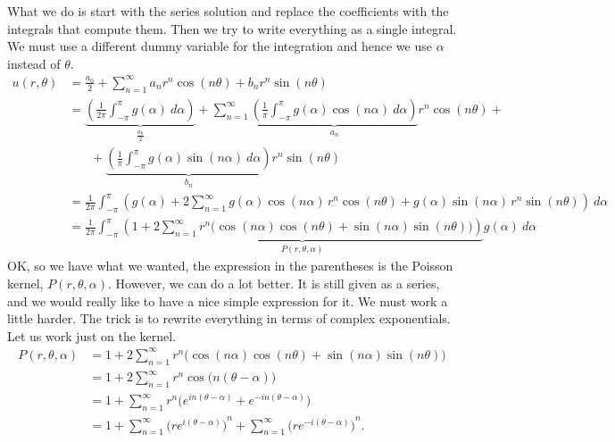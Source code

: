 What we do is start with the series solution and replace the coefficients
with the integrals that compute them.  Then we try to write everything as
a single integral.  We must use a different dummy variable for the
integration and hence we use $\alpha$ instead of $\theta$.
\begin{equation*}
\begin{split}
u(r,\theta)
& =
\frac{a_0}{2} +
\sum_{n=1}^\infty
a_n r^n \cos(n \theta) + b_n r^n \sin(n \theta)
\\
& =
\underbrace{
 \left(
  \frac{1}{2\pi} \int_{-\pi}^\pi g(\alpha) ~ d\alpha
 \right)
}_{\frac{a_0}{2}}
+
\sum_{n=1}^\infty
\underbrace{
 \left(
  \frac{1}{\pi} \int_{-\pi}^\pi g(\alpha) \cos (n\alpha) ~ d\alpha
 \right)
}_{a_n}
r^n \cos(n \theta) +
\\
& ~~~~~~~~ +
\underbrace{
 \left(
  \frac{1}{\pi} \int_{-\pi}^\pi g(\alpha) \sin (n\alpha) ~ d\alpha
 \right)
}_{b_n}
r^n \sin(n \theta)
\\
& =
\frac{1}{2\pi}
\int_{-\pi}^\pi
\left(  g(\alpha)
+
2
\sum_{n=1}^\infty
g(\alpha) \cos (n\alpha) 
\, r^n \cos(n \theta) +
g(\alpha) \sin (n\alpha)
\, r^n \sin(n \theta)
\right) ~d\alpha
\\
& =
\frac{1}{2\pi}
\int_{-\pi}^\pi
\underbrace{
 \left( 1
 +
 2
 \sum_{n=1}^\infty
 r^n 
 \bigl(
 \cos (n\alpha) 
 \cos(n \theta) +
 \sin (n\alpha)
 \sin(n \theta) \bigr)
 \right)
}_{P(r,\theta,\alpha)}
g(\alpha) ~d\alpha
\end{split}
\end{equation*}
OK\@, so we have what we wanted, the expression in the parentheses is the
Poisson kernel, $P(r,\theta,\alpha)$.  However, we can do a lot better.  It is still given as a
series, and we would really like to have a nice simple expression for it. 
We must work a little harder.  The trick is to rewrite everything in terms of
complex exponentials.  Let us work
just on the kernel.
\begin{equation*}
\begin{split}
P(r,\theta,\alpha)
& =
1
+
2
\sum_{n=1}^\infty
r^n 
\bigl(
\cos (n\alpha) 
\cos(n \theta) +
\sin (n\alpha)
\sin(n \theta) \bigr)
\\
& =
1
+
2
\sum_{n=1}^\infty
r^n 
\cos \bigl(n(\theta-\alpha)\bigr)
\\
& =
1
+
\sum_{n=1}^\infty
r^n 
\bigl(
e^{in(\theta-\alpha)} +
e^{-in(\theta-\alpha)} \bigr)
\\
& =
1
+
\sum_{n=1}^\infty
{\bigl(
re^{i(\theta-\alpha)}\bigr)}^{n}
+
\sum_{n=1}^\infty
{\bigl(
re^{-i(\theta-\alpha)}\bigr)}^{n} .
\end{split}
\end{equation*}
